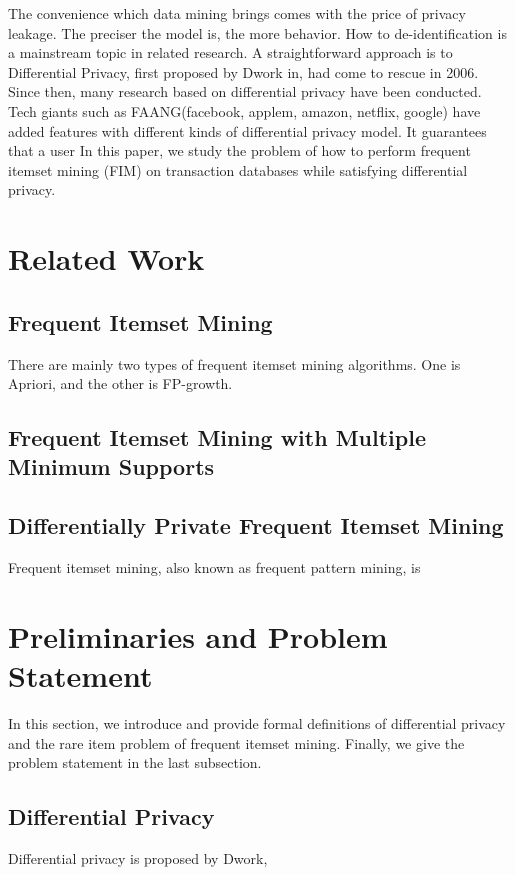 \documentclass[conference]{IEEEtran}
\begin{document}
The convenience which data mining brings comes with the price of privacy leakage. The preciser the model is, the more behavior. 
How to de-identification is a mainstream topic in related research.
A straightforward approach is to  
Differential Privacy, first proposed by Dwork in\cite{b4}, had come to rescue in 2006. 
Since then, many research based on differential privacy have been conducted. Tech giants such as FAANG(facebook, applem, amazon, netflix, google) have added features with different kinds of differential privacy model.
It guarantees that a user 
In this paper, we study the problem of how to perform frequent itemset mining (FIM) on transaction databases while satisfying differential privacy.


\section{Related Work}
\subsection{Frequent Itemset Mining}
There are mainly two types of frequent itemset mining algorithms. 
One is Apriori, and the other is FP-growth. 
\subsection{Frequent Itemset Mining with Multiple Minimum Supports}

\subsection{Differentially Private Frequent Itemset Mining}
Frequent itemset mining, also known as frequent pattern mining, is 


\section{Preliminaries and Problem Statement}
In this section, we introduce and provide formal definitions of differential privacy and the rare item problem of frequent itemset mining. 
Finally, we give the problem statement in the last subsection.

\subsection{Differential Privacy}%
Differential privacy is proposed by Dwork\cite{b6}, 
\end{document}
